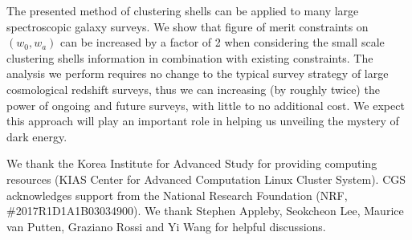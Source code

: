 \documentclass[prl,twocolumn,superscriptaddress,aps,amsmath,amssymb,nofootinbib,altaffilletter]{revtex4}
\begin{document}
The presented method of clustering shells can be applied to many large spectroscopic galaxy surveys. 
We show that figure of merit constraints on  $(w_0, w_a)$ can be increased by a factor of 2 when considering the small scale clustering shells information in combination with existing constraints. The analysis we perform requires no change to the typical survey strategy of large cosmological redshift surveys, thus we can increasing (by roughly twice) the power of ongoing and future surveys, with little to no additional cost.
We expect this approach will play an important role in helping us unveiling the mystery of dark energy.



\begin{acknowledgments}
We thank the Korea Institute for Advanced Study for providing computing resources (KIAS Center for Advanced Computation Linux Cluster System).
CGS acknowledges support from the National Research Foundation (NRF,  \#2017R1D1A1B03034900). 
We thank Stephen Appleby, Seokcheon Lee, Maurice van Putten, Graziano Rossi and Yi Wang for helpful discussions.
\end{acknowledgments}





\end{document}
